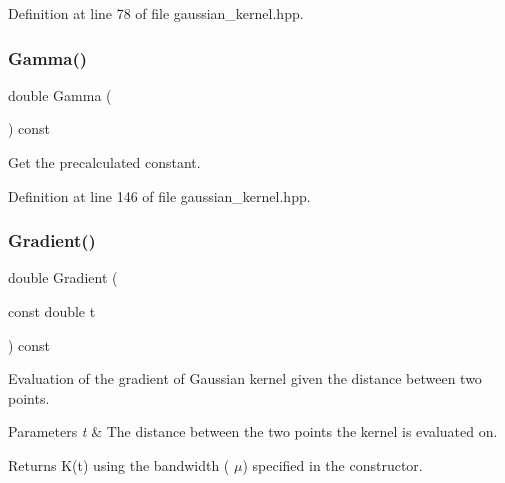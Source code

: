 Definition at line 78 of file gaussian\+\_\+kernel.\+hpp.

\mbox{\label{classmlpack_1_1kernel_1_1GaussianKernel_aebe61d5199ae22a5d9101a5cee3dfbd7}} 
\subsubsection{Gamma()}
{\footnotesize\ttfamily double Gamma (\begin{DoxyParamCaption}{ }\end{DoxyParamCaption}) const\hspace{0.3cm}{\ttfamily [inline]}}



Get the precalculated constant. 



Definition at line 146 of file gaussian\+\_\+kernel.\+hpp.

\mbox{\label{classmlpack_1_1kernel_1_1GaussianKernel_a6abdb9c6ceb3252af988ab5fb5f13764}} 
\subsubsection{Gradient()}
{\footnotesize\ttfamily double Gradient (\begin{DoxyParamCaption}\item[{const double}]{t }\end{DoxyParamCaption}) const\hspace{0.3cm}{\ttfamily [inline]}}



Evaluation of the gradient of Gaussian kernel given the distance between two points. 


\begin{DoxyParams}{Parameters}
{\em t} & The distance between the two points the kernel is evaluated on. \\
\hline
\end{DoxyParams}
\begin{DoxyReturn}{Returns}
K(t) using the bandwidth ( $\mu$) specified in the constructor. 
\end{DoxyReturn}


